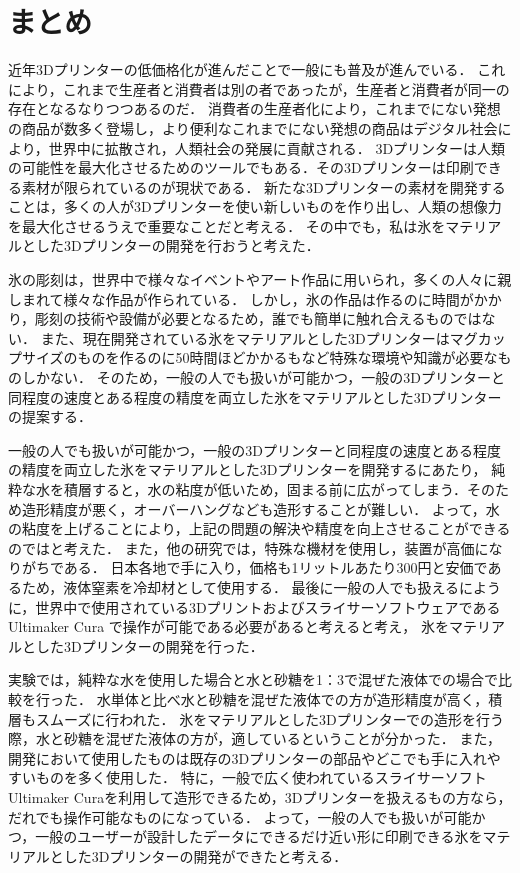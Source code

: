 \chapter{まとめ}
\label{chp:first}

近年3Dプリンターの低価格化が進んだことで一般にも普及が進んでいる．
これにより，これまで生産者と消費者は別の者であったが，生産者と消費者が同一の存在となるなりつつあるのだ．
消費者の生産者化により，これまでにない発想の商品が数多く登場し，より便利なこれまでにない発想の商品はデジタル社会により，世界中に拡散され，人類社会の発展に貢献される．
3Dプリンターは人類の可能性を最大化させるためのツールでもある．その3Dプリンターは印刷できる素材が限られているのが現状である．
新たな3Dプリンターの素材を開発することは，多くの人が3Dプリンターを使い新しいものを作り出し、人類の想像力を最大化させるうえで重要なことだと考える．
その中でも，私は氷をマテリアルとした3Dプリンターの開発を行おうと考えた．

氷の彫刻は，世界中で様々なイベントやアート作品に用いられ，多くの人々に親しまれて様々な作品が作られている．
しかし，氷の作品は作るのに時間がかかり，彫刻の技術や設備が必要となるため，誰でも簡単に触れ合えるものではない．
また、現在開発されている氷をマテリアルとした3Dプリンターはマグカップサイズのものを作るのに50時間ほどかかるもなど特殊な環境や知識が必要なものしかない．
そのため，一般の人でも扱いが可能かつ，一般の3Dプリンターと同程度の速度とある程度の精度を両立した氷をマテリアルとした3Dプリンターの提案する．

一般の人でも扱いが可能かつ，一般の3Dプリンターと同程度の速度とある程度の精度を両立した氷をマテリアルとした3Dプリンターを開発するにあたり，
純粋な水を積層すると，水の粘度が低いため，固まる前に広がってしまう．そのため造形精度が悪く，オーバーハングなども造形することが難しい．
よって，水の粘度を上げることにより，上記の問題の解決や精度を向上させることができるのではと考えた．
また，他の研究では，特殊な機材を使用し，装置が高価になりがちである．
日本各地で手に入り，価格も1リットルあたり300円と安価であるため，液体窒素を冷却材として使用する．
最後に一般の人でも扱えるにように，世界中で使用されている3Dプリントおよびスライサーソフトウェアである Ultimaker Cura で操作が可能である必要があると考えると考え，
氷をマテリアルとした3Dプリンターの開発を行った．

実験では，純粋な水を使用した場合と水と砂糖を1：3で混ぜた液体での場合で比較を行った．
水単体と比べ水と砂糖を混ぜた液体での方が造形精度が高く，積層もスムーズに行われた．
氷をマテリアルとした3Dプリンターでの造形を行う際，水と砂糖を混ぜた液体の方が，適しているということが分かった．
また，開発において使用したものは既存の3Dプリンターの部品やどこでも手に入れやすいものを多く使用した．
特に，一般で広く使われているスライサーソフトUltimaker Curaを利用して造形できるため，3Dプリンターを扱えるもの方なら，だれでも操作可能なものになっている．
よって，一般の人でも扱いが可能かつ，一般のユーザーが設計したデータにできるだけ近い形に印刷できる氷をマテリアルとした3Dプリンターの開発ができたと考える．

